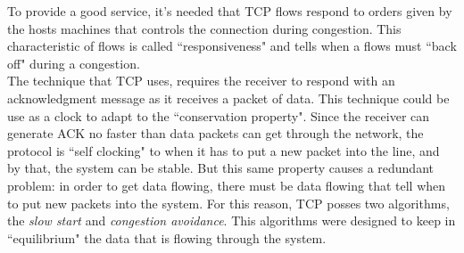 To provide a good service, it's needed that TCP flows respond to orders given by
the hosts machines that controls the connection during congestion. This
characteristic of flows is called ``responsiveness" and tells when a flows must
``back off" during a congestion.\\

The technique that TCP uses, requires the receiver to respond with an
acknowledgment message as it receives a packet of data. This technique could be
use as a clock to adapt to the ``conservation property". Since the receiver can
generate ACK no faster than data packets can get through the network, the
protocol is ``self clocking" to when it has to put a new packet into the line,
and by that, the system can be stable. But this same property causes a redundant
problem: in order to get data flowing, there must be data flowing that tell when
to put new packets into the system. For this reason, TCP posses two algorithms,
the \textit{slow start} and \textit{congestion avoidance}. This algorithms were
designed to keep in ``equilibrium" the data that is flowing through the
system.\\

